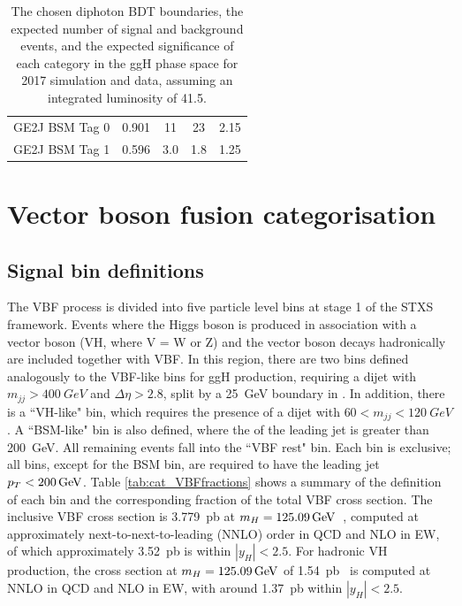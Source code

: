 \begin{table}
\begin{centering}
\begin{tabular}{ r | c | c | c | c }
    GE2J BSM  Tag 0  & 0.901            & 11     & 23         & 2.15                    \\
    GE2J BSM  Tag 1  & 0.596            & 3.0    & 1.8        & 1.25                    \\
    \hline 
    \end{tabular}
    \caption{The chosen diphoton BDT boundaries, 
    the expected number of signal and background events, 
    and the expected significance of each category in the ggH phase space 
    for 2017 simulation and data, assuming an integrated luminosity of \SI{41.5}{\fbinv}.}
    \label{tab:cat_ggHsignificance2017}
  \end{centering}
\end{table}

\section{Vector boson fusion categorisation}
\subsection{Signal bin definitions}

The VBF process is divided into five particle level bins at stage 1 of the STXS framework.
Events where the Higgs boson is produced in association with a vector boson (VH, where V = W or Z) 
and the vector boson decays hadronically are included together with VBF.
In this region, there are two bins defined analogously to the VBF-like bins for ggH production, 
requiring a dijet with $m_{jj} > \SI{400}{GeV}$ and $\Delta\eta > 2.8$, 
split by a \SI{25}{GeV} boundary in \ptHjj.
In addition, there is a ``VH-like" bin, 
which requires the presence of a dijet with $60 < m_{jj} < \SI{120}{GeV}$. 
A ``BSM-like" bin is also defined, where the \pt of the leading jet is greater than \SI{200}{GeV}.
All remaining events fall into the ``VBF rest" bin.
Each bin is exclusive; all bins, except for the BSM bin, 
are required to have the leading jet $p_T < \SI{200}{GeV}$.
Table \ref{tab:cat_VBFfractions} shows a summary of the definition of each bin 
and the corresponding fraction of the total VBF cross section.
The inclusive VBF cross section is \SI{3.779}{pb} at $m_{H} = \SI{125.09}{GeV}$~\cite{YR4},
computed at approximately next-to-next-to-leading (NNLO) order in QCD and NLO in EW,
of which approximately \SI{3.52}{pb} is within $|y_H| < 2.5$.
For hadronic VH production, 
the cross section at $m_{H} = \SI{125.09}{GeV}$ of \SI{1.54}{pb}~\cite{YR4}
is computed at NNLO in QCD and NLO in EW, 
with around \SI{1.37}{pb} within $|y_H| < 2.5$.

